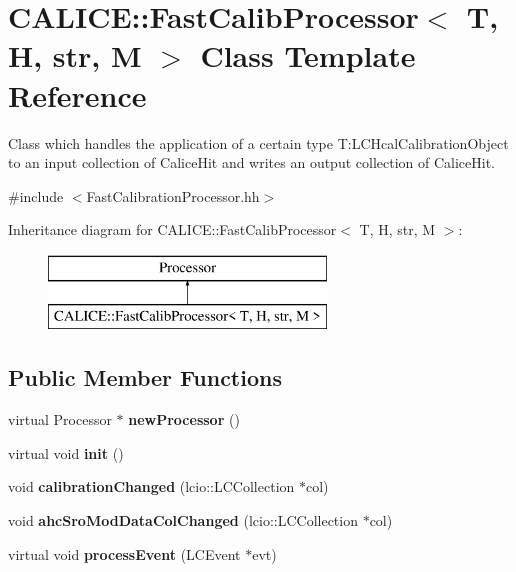 \section{C\-A\-L\-I\-C\-E\-:\-:Fast\-Calib\-Processor$<$ T, H, str, M $>$ Class Template Reference}
\label{classCALICE_1_1FastCalibProcessor}


Class which handles the application of a certain type T\-:L\-C\-Hcal\-Calibration\-Object to an input collection of Calice\-Hit and writes an output collection of Calice\-Hit.  




{\ttfamily \#include $<$Fast\-Calibration\-Processor.\-hh$>$}

Inheritance diagram for C\-A\-L\-I\-C\-E\-:\-:Fast\-Calib\-Processor$<$ T, H, str, M $>$\-:\begin{figure}[H]
\begin{center}
\leavevmode
\includegraphics[height=2.000000cm]{classCALICE_1_1FastCalibProcessor}
\end{center}
\end{figure}
\subsection*{Public Member Functions}
\begin{DoxyCompactItemize}
\item 
virtual Processor $\ast$ {\bfseries new\-Processor} ()\label{classCALICE_1_1FastCalibProcessor_a3118254e508e231dd79614ed367b1de0}

\item 
virtual void {\bfseries init} ()\label{classCALICE_1_1FastCalibProcessor_a4b47376d1de4a95324feb266d3e04fe2}

\item 
void {\bfseries calibration\-Changed} (lcio\-::\-L\-C\-Collection $\ast$col)\label{classCALICE_1_1FastCalibProcessor_af0849f090e34dfa2a136d07188141064}

\item 
void {\bfseries ahc\-Sro\-Mod\-Data\-Col\-Changed} (lcio\-::\-L\-C\-Collection $\ast$col)\label{classCALICE_1_1FastCalibProcessor_a16d81154984d0fef91516ecc4d727a7f}

\item 
virtual void {\bfseries process\-Event} (L\-C\-Event $\ast$evt)\label{classCALICE_1_1FastCalibProcessor_a9f3a0e4a323ef030adc45d40d023ecff}

\end{DoxyCompactItemize}
